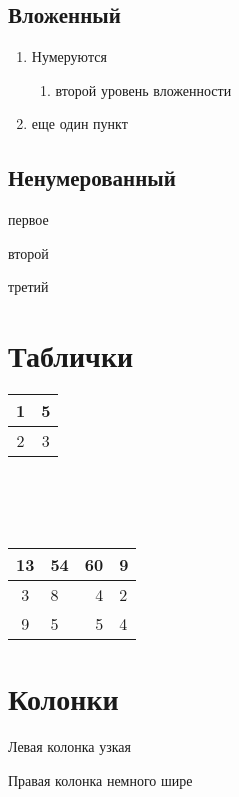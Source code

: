 \documentclass[12pt]{article}
\begin{document}
\subsection{Вложенный}
\begin{enumerate}
\item Нумеруются
\begin{enumerate}
\item второй уровень вложенности
\end{enumerate}
\item еще один пункт
\end{enumerate}

\subsection{Ненумерованный}
\begin{trivlist}
\item первое
\item второй
\item третий
\end{trivlist}
\newpage

\section{Таблички}
\begin{tabular}{|c|c||}
1 & 5 \\
\hline
2 & 3
\end{tabular}
\\
\\
\\
\begin{tabular}{|c|l|r|p{6cm}|}%
\hline
13 & 54 & 60 & 9 \\
\hline
3 & 8 & 4 & 2 \\
\hline
9 & 5 & 5 & 4\\
\hline
\end{tabular}
\newpage

\section{Колонки}
\begin{minipage}[t]{14mm}
Левая колонка узкая
\end{minipage}
\hfill
\begin{minipage}[t]{38mm}
Правая колонка немного шире
\end{minipage}
\end{document}
